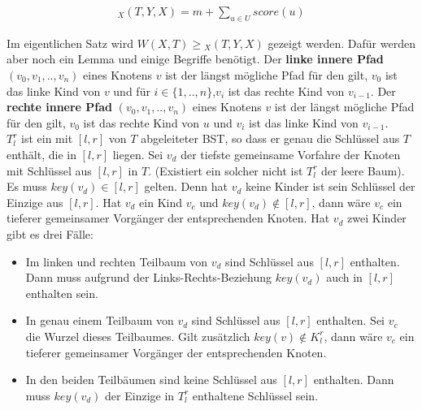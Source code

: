 \documentclass[a4paper,12pt]{article}
\begin{document}
\begin{align*}
_X(T, Y, X)  = m + \sum_{u \in U} {\mathit{score}} \left(u\right)
\end{align*} 

\noindent Im eigentlichen Satz wird $\mathit{W\left(X, T\right)} \geq {_X(T, Y, X)} $ gezeigt werden. Dafür werden aber noch ein Lemma und einige Begriffe benötigt. Der \textbf{linke innere Pfad} $\left(v_0,v_1,..,v_n \right)$ eines Knotens $v$ ist der längst mögliche Pfad für den gilt, $v_0$ ist das linke Kind von $v$ und für $i \in \{1,..,n\}$,$v_i$ ist das rechte Kind von $v_{i-1}$. Der \textbf{rechte innere Pfad} $\left(v_0,v_1,..,v_n \right)$ eines Knotens $v$ ist der längst mögliche Pfad für den gilt, $v_0$ ist das rechte Kind von $u$ und $v_i$ ist das linke Kind von $v_{i-1}$.\\ $T^r_l$ ist ein mit $\left[l,r\right]$ von $T$ abgeleiteter BST, so dass er genau die Schlüssel aus $T$ enthält, die in $\left[l, r\right]$ liegen. Sei $v_d$ der tiefste gemeinsame Vorfahre der Knoten mit Schlüssel aus  $\left[l,r\right]$ in $T$. (Existiert ein solcher nicht ist $T^r_l$ der leere Baum). Es muss $\mathit{key}(v_d) \in \left[l,r\right]$ gelten. Denn hat $v_d$ keine Kinder ist sein Schlüssel der Einzige aus $\left[l,r\right]$. Hat $v_d$ ein Kind $v_{c}$ und $\mathit{key}(v_d) \notin \left[l,r\right]$, dann wäre $v_{c}$ ein tieferer gemeinsamer Vorgänger der entsprechenden Knoten. Hat $v_d$ zwei Kinder gibt es drei Fälle:
\begin{itemize}
	\item Im linken und rechten Teilbaum von $v_d$ sind Schlüssel aus $\left[l,r\right]$ enthalten. Dann muss aufgrund der Links-Rechts-Beziehung  $\mathit{key}(v_d)$ auch in $\left[l,r\right]$ enthalten sein.
	\item In genau einem Teilbaum von $v_d$ sind Schlüssel aus $\left[l,r\right]$ enthalten. Sei $v_{c}$ die Wurzel dieses Teilbaumes. Gilt zusätzlich $\mathit{key}(v) \notin K^r_l$, dann wäre $v_c$ ein tieferer gemeinsamer Vorgänger der entsprechenden Knoten.
	\item In den beiden Teilbäumen sind keine Schlüssel aus $\left[l,r\right]$ enthalten.  Dann muss $\mathit{key}(v_d)$ der Einzige in $T^r_l$ enthaltene Schlüssel sein.
\end{itemize}
\end{document}

